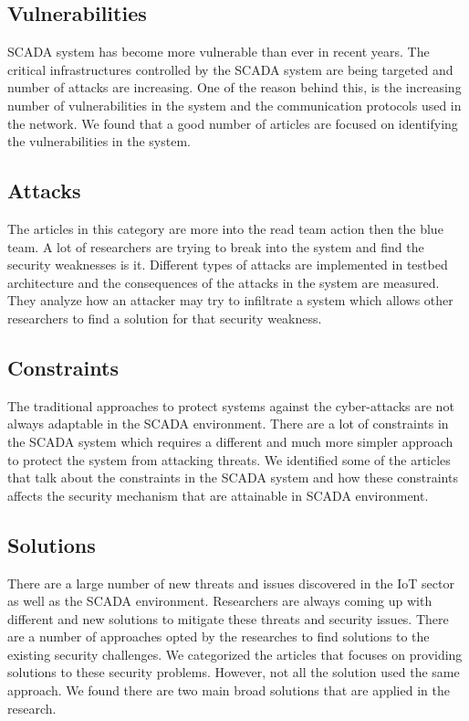 \documentclass[letterpaper, 10 pt, conference]{ieeeconf}  %
\begin{document}
\subsection{Vulnerabilities}
SCADA system has become more vulnerable than ever in recent years. The critical infrastructures controlled by the SCADA system are being targeted and number of attacks are increasing. One of the reason behind this, is the increasing number of vulnerabilities in the system and the communication protocols used in the network. We found that a good number of articles are focused on identifying the vulnerabilities in the system.
\subsection{Attacks}
The articles in this category are more into the read team action then the blue team. A lot of researchers are trying to break into the system and find the security weaknesses is it. Different types of attacks are implemented in testbed architecture and the consequences of the attacks in the system are measured. They analyze how an attacker may try to infiltrate a system which allows other researchers to find a solution for that security weakness.
\subsection{Constraints}
The traditional approaches to protect systems against the cyber-attacks are not always adaptable in the SCADA environment. There are a lot of constraints in the SCADA system which requires a different and much more simpler approach to protect the system from attacking threats. We identified some of the articles that talk about the constraints in the SCADA system and how these constraints affects the security mechanism that are attainable in SCADA environment.
\subsection{Solutions}
There are a large number of new threats and issues discovered in the IoT sector as well as the SCADA environment. Researchers are always coming up with different and new solutions to mitigate these threats and security issues. There are a number of approaches opted by the researches to find solutions to the existing security challenges. We categorized the articles that focuses on providing solutions to these security problems. However, not all the solution used the same approach. We found there are two main broad solutions that are applied in the research.
\end{document}
